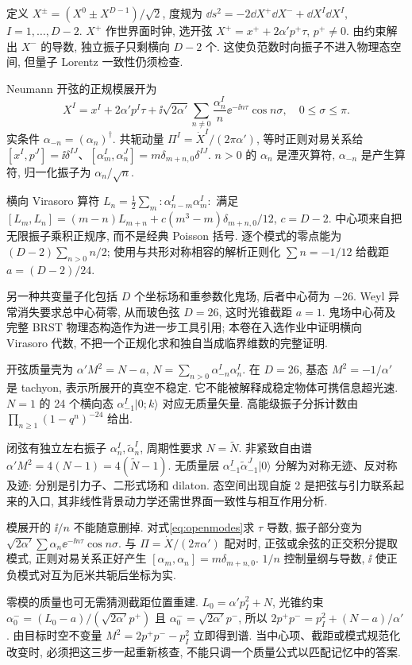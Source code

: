 \label{ch:spectrum}
定义 $X^\pm=(X^0\pm X^{D-1})/\sqrt2$, 度规为 $\dd s^2=-2\dd X^+\dd X^-+\dd X^I\dd X^I$, $I=1,\ldots,D-2$. $X^+$ 作世界面时钟, 选开弦 $X^+=x^++2\alpha'p^+\tau$, $p^+\ne0$. 由约束解出 $X^-$ 的导数, 独立振子只剩横向 $D-2$ 个. 这使负范数时向振子不进入物理态空间, 但量子 Lorentz 一致性仍须检查.

Neumann 开弦的正规模展开为
\begin{equation}\label{eq:openmodes}
X^I=x^I+2\alpha'p^I\tau+
\ii\sqrt{2\alpha'}\sum_{n\ne0}\frac{\alpha_n^I}{n}\ee^{-\ii n\tau}\cos n\sigma,
\quad0\le\sigma\le\pi.
\end{equation}
实条件 $\alpha_{-n}=(\alpha_n)^\dagger$. 共轭动量 $\Pi^I=\dot X^I/(2\pi\alpha')$, 等时正则对易关系给 $[x^I,p^J]=\ii\delta^{IJ}$、$[\alpha_m^I,\alpha_n^J]=m\delta_{m+n,0}\delta^{IJ}$. $n>0$ 的 $\alpha_n$ 是湮灭算符, $\alpha_{-n}$ 是产生算符, 归一化振子为 $\alpha_n/\sqrt n$.

横向 Virasoro 算符 $L_n=\frac12\sum_m:\alpha_{n-m}^I\alpha_m^I:$ 满足 $[L_m,L_n]=(m-n)L_{m+n}+c(m^3-m)\delta_{m+n,0}/12$, $c=D-2$. 中心项来自把无限振子乘积正规序, 而不是经典 Poisson 括号. 逐个模式的零点能为 $(D-2)\sum_{n>0}n/2$; 使用与共形对称相容的解析正则化 $\sum n=-1/12$ 给截距 $a=(D-2)/24$.

另一种共变量子化包括 $D$ 个坐标场和重参数化鬼场, 后者中心荷为 $-26$. Weyl 异常消失要求总中心荷零, 从而玻色弦 $D=26$, 这时光锥截距 $a=1$. 鬼场中心荷及完整 BRST 物理态构造作为进一步工具引用; 本卷在入选作业中证明横向 Virasoro 代数, 不把一个正规化求和独自当成临界维数的完整证明.

开弦质量壳为 $\alpha'M^2=N-a$, $N=\sum_{n>0}\alpha_{-n}^I\alpha_n^I$. 在 $D=26$, 基态 $M^2=-1/\alpha'$ 是 tachyon, 表示所展开的真空不稳定. 它不能被解释成稳定物体可携信息超光速. $N=1$ 的 24 个横向态 $\alpha_{-1}^I|0;k\rangle$ 对应无质量矢量. 高能级振子分拆计数由 $\prod_{n\ge1}(1-q^n)^{-24}$ 给出.

闭弦有独立左右振子 $\alpha_n^I,\tilde\alpha_n^I$, 周期性要求 $N=\tilde N$. 非紧致自由谱 $\alpha'M^2=4(N-1)=4(\tilde N-1)$. 无质量层 $\alpha_{-1}^I\tilde\alpha_{-1}^J|0\rangle$ 分解为对称无迹、反对称及迹: 分别是引力子、二形式场和 dilaton. 态空间出现自旋 2 是把弦与引力联系起来的入口, 其非线性背景动力学还需世界面一致性与相互作用分析.

模展开的 $\ii/n$ 不能随意删掉. 对式\eqref{eq:openmodes}求 $\tau$ 导数, 振子部分变为 $\sqrt{2\alpha'}\sum\alpha_n\ee^{-\ii n\tau}\cos n\sigma$. 与 $\Pi=\dot X/(2\pi\alpha')$ 配对时, 正弦或余弦的正交积分提取模式, 正则对易关系正好产生 $[\alpha_m,\alpha_n]=m\delta_{m+n,0}$. $1/n$ 控制量纲与导数, $\ii$ 使正负模式对互为厄米共轭后坐标为实.

零模的质量也可无需猜测截距位置重建. $L_0=\alpha'p_I^2+N$, 光锥约束 $\alpha_0^-=(L_0-a)/(\sqrt{2\alpha'}p^+)$ 且 $\alpha_0^-=\sqrt{2\alpha'}p^-$, 所以 $2p^+p^-=p_I^2+(N-a)/\alpha'$. 由目标时空不变量 $M^2=2p^+p^--p_I^2$ 立即得到谱. 当中心项、截距或模式规范化改变时, 必须把这三步一起重新核查, 不能只调一个质量公式以匹配记忆中的答案.
